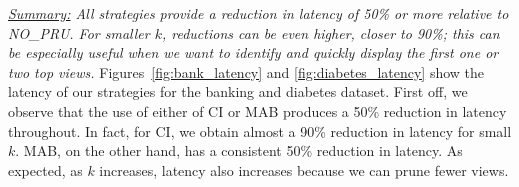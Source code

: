 {\em \underline{Summary:} All strategies provide a reduction in latency of 50\% or more
relative to NO\_PRU. For smaller $k$, reductions can be even higher, closer to 90\%; this can be
especially useful when we want to identify and quickly display the first one or two top views.}
Figures~\ref{fig:bank_latency} and \ref{fig:diabetes_latency} show the latency
of our strategies for the banking and diabetes dataset.
First off, we observe that the use of either of CI or MAB produces a 50\% reduction in latency
throughout.
In fact, for CI, we obtain almost a 90\% reduction in latency for small $k$. 
MAB, on the other hand, has a consistent 50\% reduction in latency. 
As expected, as $k$ increases, latency also increases because we can prune fewer views.



